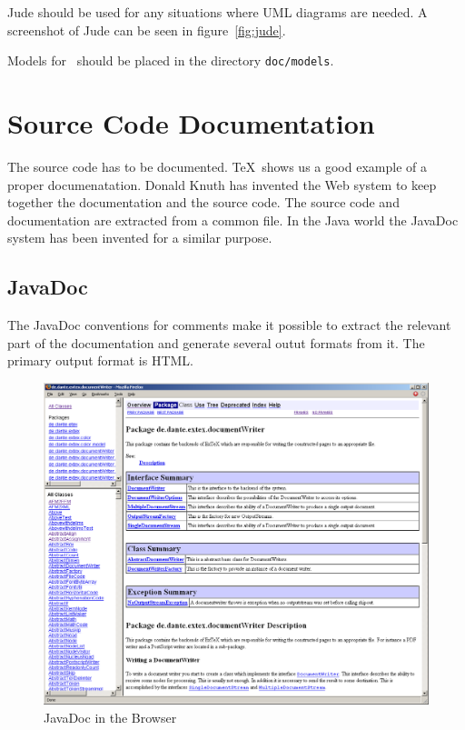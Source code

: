 \documentclass{extex-doc}
\newcommand\File[1]{\texttt{#1}}
\begin{document}
Jude should be used for any situations where UML diagrams are needed.
A screenshot of Jude can be seen in figure~\ref{fig:jude}.

Models for \ExTeX\ should be placed in the directory \File{doc/models}.


\chapter{Source Code Documentation}

The source code has to be documented. \TeX\ shows us a good example of
a proper documenatation. Donald Knuth has invented the Web system to
keep together the documentation and the source code. The source code
and documentation are extracted from a common file. In the Java world
the JavaDoc system has been invented for a similar purpose. 

\section{JavaDoc}

The JavaDoc conventions for comments make it possible to extract the
relevant part of the documentation and generate several outut formats
from it. The primary output format is HTML.
\begin{figure}[tbh]
  \centering
  \includegraphics[scale=.25]{image/javadoc}
  \caption{JavaDoc in the Browser}\label{fig:eclipse-javadoc}
\end{figure}
\end{document}
